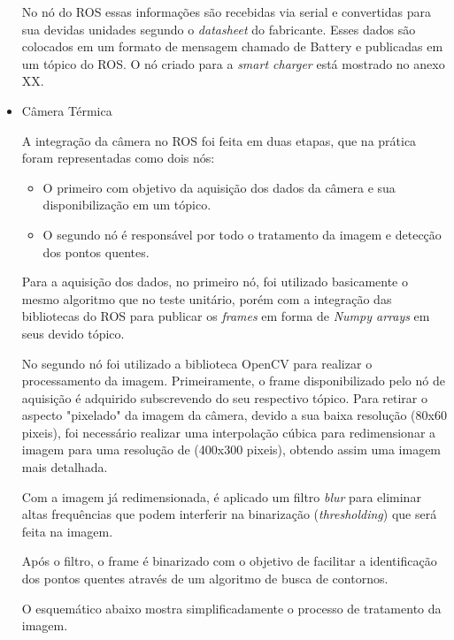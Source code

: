 \begin{itemize}
		No nó do ROS essas informações são recebidas via serial e convertidas para sua devidas unidades segundo o \textit{datasheet} do fabricante. Esses dados são colocados em um formato de mensagem chamado de Battery e publicadas em um tópico do ROS. O nó criado para a \textit{smart charger} está mostrado no anexo XX.
		
		\item Câmera Térmica
		
		A integração da câmera no ROS foi feita em duas etapas, que na prática foram representadas como dois nós:
		
		\begin{itemize}
			\item O primeiro com objetivo da aquisição dos dados da câmera e sua disponibilização em um tópico.
			\item O segundo nó é responsável por todo o tratamento da imagem e detecção dos pontos quentes.
		\end{itemize}
		
		Para a aquisição dos dados, no primeiro nó, foi utilizado basicamente o mesmo algoritmo que no teste unitário, porém com a integração das bibliotecas do ROS para publicar os \textit{frames} em forma de \textit{Numpy arrays} em seus devido tópico.
		
		No segundo nó foi utilizado a biblioteca OpenCV para realizar o processamento da imagem. Primeiramente, o frame disponibilizado pelo nó de aquisição é adquirido subscrevendo do seu respectivo tópico. Para retirar o aspecto "pixelado" da imagem da câmera, devido a sua baixa resolução (80x60 pixeis), foi necessário realizar uma interpolação cúbica para redimensionar a imagem para uma resolução de (400x300 pixeis), obtendo assim uma imagem mais detalhada. 
		
		Com a imagem já redimensionada, é aplicado um filtro \textit{blur} para eliminar altas frequências que podem interferir na binarização (\textit{thresholding}) que será feita na imagem.
		
		Após o filtro, o frame é binarizado com o objetivo de facilitar a identificação dos pontos quentes através de um algoritmo de busca de contornos.
		
		O esquemático abaixo mostra simplificadamente o processo de tratamento da imagem.
		

\end{itemize}
